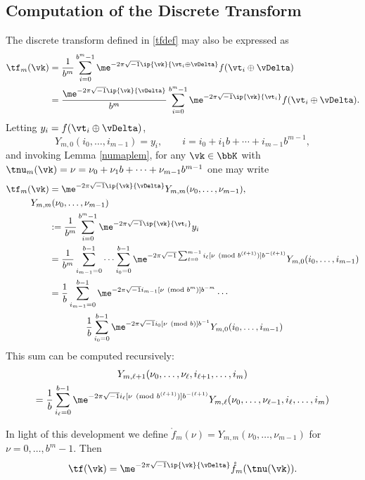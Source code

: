 \documentclass[]{elsarticle}
\theoremstyle{definition}
\begin{document}
\subsection{Computation of the Discrete Transform}
The discrete transform defined in \eqref{tfdef} may also be expressed as
\begin{align}
\nonumber
\tf_m(\vk)
&= \frac{1}{b^m} \sum_{i=0}^{b^m-1} \me^{-2 \pi \sqrt{-1} \ip{\vk}{\vt_i\oplus \vDelta}} f(\vt_i\oplus \vDelta) \\
\nonumber
&= \frac{\me^{-2 \pi \sqrt{-1} \ip{\vk}{\vDelta}}}{b^m} \sum_{i=0}^{b^m-1} \me^{-2 \pi \sqrt{-1} \ip{\vk}{\vt_i}} f(\vt_i\oplus \vDelta).
\end{align}
Letting $y_i=f(\vt_i\oplus \vDelta)$,
\[
Y_{m,0}(i_0,\ldots, i_{m-1}) = y_i, \qquad i=i_0 + i_1 b + \cdots + i_{m-1} b^{m-1},
\]
and invoking Lemma \ref{numaplem}, for any $\vk \in \bbK$ with $\tnu_m(\vk)=\nu = \nu_0 + \nu_1 b  + \cdots + \nu_{m-1} b^{m-1}$ one may write
\begin{align}
\nonumber
\tf_m(\vk) &= \me^{-2 \pi \sqrt{-1} \ip{\vk}{\vDelta}}  Y_{m,m}(\nu_0, \ldots, \nu_{m-1}) , \\
\nonumber
\MoveEqLeft{Y_{m,m}(\nu_0, \ldots, \nu_{m-1})}\\
\nonumber
& : = \frac{1}{b^m} \sum_{i=0}^{b^m-1} \me^{-2 \pi \sqrt{-1} \ip{\vk}{\vt_i}} y_i \\
\nonumber
& = \frac{1}{b^m} \sum_{i_{m-1}=0}^{b-1} \cdots \sum_{i_0=0}^{b-1} \me^{-2 \pi \sqrt{-1}\sum_{\ell=0}^{m-1} i_\ell [\nu \pmod  {b^{(\ell+1)}}]  b^{-(\ell+1)}} Y_{m,0}(i_0,\ldots, i_{m-1}) \\
\nonumber
& = \frac{1}{b} \sum_{i_{m-1}=0}^{b-1}\me^{-2 \pi \sqrt{-1}  i_{m-1}[\nu \pmod  {b^{m}}]  b^{-m}}  \cdots \\
&\qquad \qquad \frac{1}{b} \sum_{i_0=0}^{b-1} \me^{-2 \pi \sqrt{-1} i_0 [\nu \pmod  {b}]  b^{-1}} Y_{m,0}(i_0,\ldots, i_{m-1})
\nonumber
\end{align}
This sum can be computed recursively:
\begin{multline*}
Y_{m,\ell+1}(\nu_0, \ldots, \nu_{\ell},i_{\ell+1}, \ldots, i_m) \\
= \frac{1}{b} \sum_{i_\ell=0}^{b-1} \me^{-2 \pi \sqrt{-1}  i_{\ell}[\nu \pmod  {b^{(\ell+1)}}]  b^{-(\ell+1)}} Y_{m,\ell}(\nu_0, \ldots, \nu_{\ell-1},i_{\ell}, \ldots, i_m)
\end{multline*}

In light of this development we define $\mathring{f}_m(\nu)=Y_{m,m}(\nu_0, \ldots, \nu_{m-1})$ for $\nu=0, \ldots, b^{m}-1$. Then
\[
\tf(\vk) = \me^{-2 \pi \sqrt{-1} \ip{\vk}{\vDelta}} \mathring{f}_m(\tnu(\vk)).
\]
\end{document}
